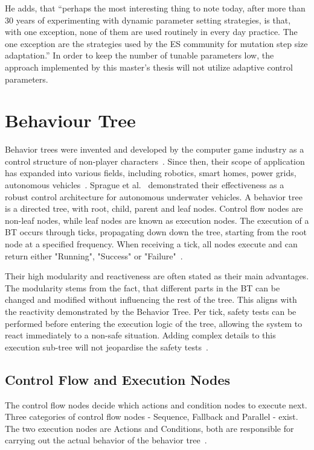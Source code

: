 He adds, that \enquote{perhaps the most interesting thing to note today, after more than 30 years of experimenting with dynamic parameter setting strategies, is that, with one exception, none of them are used routinely in every day practice. The one exception are the strategies used by the ES community for mutation step size adaptation.} In order to keep the number of tunable parameters low, the approach implemented by this master's thesis will not utilize adaptive control parameters.

\section{Behaviour Tree}
Behavior trees were invented and developed by the computer game industry as a control structure of non-player characters~\cite{collendanchise_behavior_2019}. Since then, their scope of application has expanded into various fields, including robotics, smart homes, power grids, autonomous vehicles~\cite{iovino_survey_2022}. Sprague et al.~\cite{sprague_improving_2018} demonstrated their effectiveness as a robust control architecture for autonomous underwater vehicles. A behavior tree is a directed tree, with root, child, parent and leaf nodes. Control flow nodes are non-leaf nodes, while leaf nodes are known as execution nodes. The execution of a BT occurs through ticks, propagating down down the tree, starting from the root node at a specified frequency. When receiving a tick, all nodes execute and can return either "Running", "Success" or "Failure"~\cite{collendanchise_behavior_2019}.

Their high modularity and reactiveness are often stated as their main advantages. The modularity stems from the fact, that different parts in the BT can be changed and modified without influencing the rest of the tree. This aligns with the reactivity demonstrated by the Behavior Tree. Per tick, safety tests can be performed before entering the execution logic of the tree, allowing the system to react immediately to a non-safe situation. Adding complex details to this execution sub-tree will not jeopardise the safety tests~\cite{sprague_improving_2018}.

\subsection{Control Flow and Execution Nodes}
The control flow nodes decide which actions and condition nodes to execute next. Three categories of control flow nodes - Sequence, Fallback and Parallel - exist. The two execution nodes are Actions and Conditions, both are responsible for carrying out the actual behavior of the behavior tree~\cite{collendanchise_behavior_2019}.

